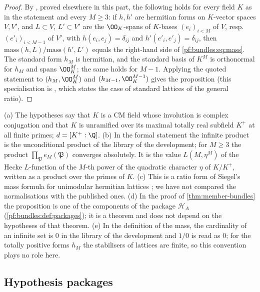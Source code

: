 \begin{proof}
By , proved elsewhere in this part, the following holds for every field $K$ as in
the statement and every $M\ge3$: if $h,h'$ are hermitian forms on $K$-vector spaces $V,V'$, and $L\subset V$, $L'\subset V'$ are the
$\OO_K$-spans of $K$-bases $(e_i)_{i<M}$ of $V$, resp.\ $(e'_i)_{i<M-1}$ of $V'$, with $h(e_i,e_j)=\delta_{ij}$ and
$h'(e'_i,e'_j)=\delta_{ij}$, then $\mathrm{mass}(h,L)/\mathrm{mass}(h',L')$ equals the right-hand side of \eqref{pf:bundles:eq:mass}.
The standard form $h_M$ is hermitian, and the standard basis of $K^M$ is orthonormal for $h_M$ and spans $\OO_K^M$; the same holds for
$M-1$. Applying the quoted statement to $(h_M,\OO_K^M)$ and $(h_{M-1},\OO_K^{M-1})$ gives the proposition (this specialisation is
, which states the case of standard lattices of
the general ratio).
\end{proof}

\begin{remark}\label{pf:bundles:rem:mass}
(a) The hypotheses say that $K$ is a CM field whose involution is complex conjugation and that $K$ is unramified over its maximal
totally real subfield $K^+$ at all finite primes; $d=[K^+:\Q]$. (b) In the formal statement the infinite product is the unconditional
product of the library of the development; for $M\ge3$ the product $\prod_{\mathfrak P}e_M(\mathfrak P)$ converges absolutely. It is
the value $L(M,\eta^M)$ of the Hecke $L$-function of the $M$-th power of the quadratic character $\eta$ of $K/K^+$, written as a
product over the primes of $K$. (c) This is a ratio form of Siegel's mass formula for unimodular hermitian lattices
\cite{Siegel1935,Prasad1989,GanHankeYu2001}; we have not compared the normalisations with the published ones. (d) In the proof of
\cref{thm:member-bundles} the proposition is one of the components of the package $\mathcal H_A$ (\cref{pf:bundles:def:packages}); it is a
theorem and does not depend on the hypotheses of that theorem. (e) In the definition of the mass, the cardinality of an infinite set is $0$ in
the library of the development and $1/0$ is read as $0$; for the totally positive forms $h_M$ the stabilisers of lattices are finite, so this
convention plays no role here.
\end{remark}

\subsection{Hypothesis packages}\label{pf:bundles:packages}

